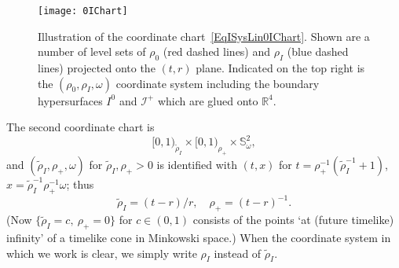 \documentclass[reqno,11pt,letterpaper]{amsart}
\numberwithin{equation}{section}
\numberwithin{figure}{section}
\theoremstyle{definition}
\theoremstyle{remark}
\newcommand{\ms}{\mathscr}
\newcommand{\scri}{\ms I}
\newcommand{\R}{\mathbb{R}}
\newcommand{\Sph}{\mathbb{S}}
\begin{document}
\begin{figure}[!ht]
\texttt{[image: 0IChart]}
\caption{Illustration of the coordinate chart~\eqref{EqISysLin0IChart}. Shown are a number of level sets of $\rho_0$ (red dashed lines) and $\rho_I$ (blue dashed lines) projected onto the $(t,r)$ plane. Indicated on the top right is the $(\rho_0,\rho_I,\omega)$ coordinate system including the boundary hypersurfaces $I^0$ and $\scri^+$ which are glued onto $\R^4$.}
\label{Fig0IChart}
\end{figure}

The second coordinate chart is
\[
  [0,1)_{\tilde\rho_I} \times [0,1)_{\rho_+} \times \Sph^2_\omega,
\]
and $(\tilde\rho_I,\rho_+,\omega)$ for $\tilde\rho_I,\rho_+>0$ is identified with $(t,x)$ for $t=\rho_+^{-1}(\tilde\rho_I^{-1}+1)$, $x=\tilde\rho_I^{-1}\rho_+^{-1}\omega$; thus
\begin{equation}
\label{EqISysLinIPChart}
  \tilde\rho_I = (t-r)/r,\quad \rho_+=(t-r)^{-1}.
\end{equation}
(Now $\{\tilde\rho_I=c,\ \rho_+=0\}$ for $c\in(0,1)$ consists of the points `at (future timelike) infinity' of a timelike cone in Minkowski space.) When the coordinate system in which we work is clear, we simply write $\rho_I$ instead of $\tilde\rho_I$.
\end{document}
